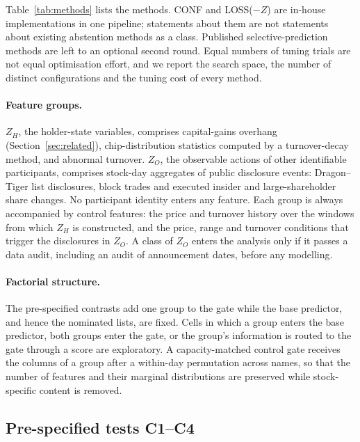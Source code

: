 \documentclass[11pt]{article}
\theoremstyle{remark}
\newcommand{\ZH}{Z_H}
\newcommand{\ZO}{Z_O}
\begin{document}
Table~\ref{tab:methods} lists the methods. CONF and LOSS($-Z$) are in-house implementations in
one pipeline; statements about them are not statements about existing abstention methods as a
class. Published selective-prediction methods
\citep{geifman2017selective,geifman2019selectivenet,ziyin2019deepgamblers,zhang2023abstain,khosravi2026csa,xu2024arcps}
are left to an optional second round. Equal numbers of tuning trials are not equal optimisation
effort, and we report the search space, the number of distinct configurations and the tuning
cost of every method.

\paragraph{Feature groups.}
$\ZH$, the holder-state variables, comprises capital-gains overhang
(Section~\ref{sec:related}), chip-distribution statistics computed by a turnover-decay method,
and abnormal turnover. $\ZO$, the
observable actions of other identifiable participants, comprises stock-day aggregates of public
disclosure events: Dragon--Tiger list disclosures, block trades and executed insider and
large-shareholder share changes. No participant identity enters any feature. Each group is
always accompanied by control features: the price and turnover history over the windows from
which $\ZH$ is constructed, and the price, range and turnover conditions that trigger the
disclosures in $\ZO$. A class of $\ZO$ enters the analysis only if it passes a data audit,
including an audit of announcement dates, before any modelling.

\paragraph{Factorial structure.}
The pre-specified contrasts add one group to the gate while the base predictor, and hence the
nominated lists, are fixed. Cells in which a group enters the base predictor, both groups enter
the gate, or the group's information is routed to the gate through a score are exploratory. A
capacity-matched control gate receives the columns of a group after a within-day permutation
across names, so that the number of features and their marginal distributions are preserved
while stock-specific content is removed.

\subsection{Pre-specified tests C1--C4}
\label{sec:tests}
\end{document}
